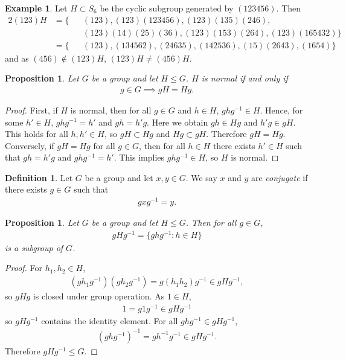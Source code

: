 \documentclass[12pt]{report}
\theoremstyle{plain}
\newtheorem{proposition}[theorem]{Proposition}
\theoremstyle{remark}
\theoremstyle{definition}
\newtheorem{definition}[theorem]{Definition}
\newtheorem{example}[theorem]{Example}
\begin{document}
\begin{example}
    Let $H\subset S_6$ be the cyclic subgroup generated by $(123456)$. Then
    \begin{alignat*}{2}
        (123)H &= \{ &&(123),(123)(123456),(123)(135)(246), \\
        & && (123)(14)(25)(36),(123)(153)(264),(123)(165432)\} \\
        &= \{ && (123), (134562), (24635), (142536), (15)(2643), (1654)\}
    \end{alignat*}
    and as $(456)\not\in (123)H$, $(123)H\neq (456)H$.
\end{example}

\begin{proposition}
    Let $G$ be a group and let $H\le G$. $H$ is normal if and only if
    \begin{align*}
        g\in G\implies gH=Hg.
    \end{align*}
\end{proposition}
\begin{proof}
    First, if $H$ is normal, then for all $g\in G$ and $h\in H$, $ghg^{-1}\in H$. Hence, for some $h'\in H$, $ghg^{-1}=h'$ and $gh=h'g$. Here we obtain $gh\in Hg$ and $h'g\in gH$. This holds for all $h,h'\in H$, so $gH\subset Hg$ and $Hg\subset gH$. Therefore $gH=Hg$. \\

    Conversely, if $gH=Hg$ for all $g\in G$, then for all $h\in H$ there exists $h'\in H$ such that $gh=h'g$ and $ghg^{-1}= h'$. This implies $ghg^{-1}\in H$, so $H$ is normal.
\end{proof}

\begin{definition}
    Let $G$ be a group and let $x,y\in G$. We say $x$ and $y$ are \emph{conjugate} if there exists $g\in G$ such that
    \begin{align*}
        gxg^{-1}=y.
    \end{align*}
\end{definition}

\begin{proposition}
    Let $G$ be a group and let $H\le G$. Then for all $g\in G$,
    \begin{align*}
        gHg^{-1} = \{ghg^{-1}:h\in H\}
    \end{align*}
    is a subgroup of $G$.
\end{proposition}
\begin{proof}
    For $h_1,h_2\in H$,
    \begin{align*}
        (gh_1g^{-1})(gh_2g^{-1}) = g(h_1h_2)g^{-1} \in gHg^{-1},
    \end{align*}
    so $gHg$ is closed under group operation. As $1\in H$,
    \begin{align*}
        1=g1g^{-1}\in gHg^{-1}
    \end{align*}
    so $gHg^{-1}$ contains the identity element. For all $ghg^{-1}\in gHg^{-1}$,
    \begin{align*}
        (ghg^{-1})^{-1}=gh^{-1}g^{-1}\in gHg^{-1}.
    \end{align*}
    Therefore $gHg^{-1}\le G$.
\end{proof}
\end{document}
